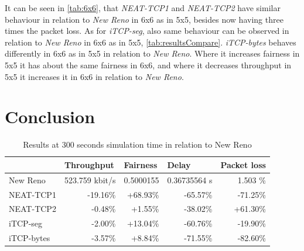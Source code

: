 It can be seen in \autoref{tab:6x6}, that \textit{NEAT-TCP1} and \textit{NEAT-TCP2} have similar behaviour in relation to \textit{New Reno} in 6x6 as in 5x5, besides now having three times the packet loss. 
As for \textit{iTCP-seg}, also same behaviour can be observed in relation to \textit{New Reno} in 6x6 as in 5x5, \autoref{tab:resultsCompare}.
\textit{iTCP-bytes} behaves differently in 6x6 as in 5x5 in relation to \textit{New Reno}. Where it increases fairness in 5x5 it has about the same fairness in 6x6, and where it decreases throughput in 5x5 it increases it in 6x6 in relation to \textit{New Reno}.


\section{Conclusion}\label{sec:resConclusion}
\begin{table}[htbp]
  \centering
    \caption{Results at 300 seconds simulation time in relation to New Reno}
    \begin{tabular}{|l|r|r|r|r|}
    \hline
          & \multicolumn{1}{l|}{Throughput} & \multicolumn{1}{l|}{Fairness} & \multicolumn{1}{l|}{Delay} & \multicolumn{1}{l|}{Packet loss} \\
    \hline
    New Reno & 523.759 kbit/s & 0.5000155 & 0.36735564 s & 1.503 \% \\
    \hline
    NEAT-TCP1 & -19.16\% & +68.93\% & -65.57\% & -71.25\% \\
    \hline
    NEAT-TCP2 & -0.48\% & +1.55\% & -38.02\% & +61.30\% \\
    \hline
   iTCP-seg & -2.00\% & +13.04\% & -60.76\% & -19.90\% \\\hline
   iTCP-bytes & -3.57\% & +8.84\% & -71.55\% & -82.60\% \\\hline
   \end{tabular}%

  \label{tab:resultsCompare}%
\end{table}%
  

